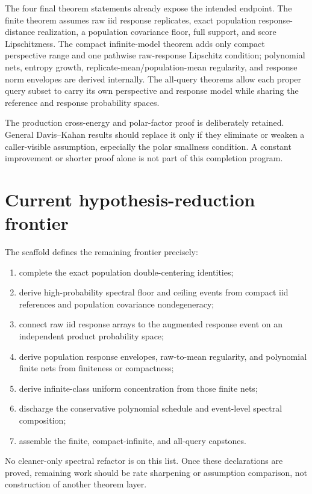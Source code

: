 \documentclass[11pt]{article}
\begin{document}
The four final theorem statements already expose the intended endpoint.  The
finite theorem assumes raw iid response replicates, exact population
response-distance realization, a population covariance floor, full support,
and score Lipschitzness.  The compact infinite-model theorem adds only compact
perspective range and one pathwise raw-response Lipschitz condition; polynomial
nets, entropy growth, replicate-mean/population-mean regularity, and response
norm envelopes are derived internally.  The all-query theorems
allow each proper query subset to carry its own perspective and response model
while sharing the reference and response probability spaces.

The production cross-energy and polar-factor proof is deliberately retained.
General Davis--Kahan results should replace it only if they eliminate or weaken
a caller-visible assumption, especially the polar smallness condition.  A
constant improvement or shorter proof alone is not part of this completion
program.

\section{Current hypothesis-reduction frontier}

The scaffold defines the remaining frontier precisely:
\begin{enumerate}
\item complete the exact population double-centering identities;
\item derive high-probability spectral floor and ceiling events from compact iid
      references and population covariance nondegeneracy;
\item connect raw iid response arrays to the augmented response event on an
      independent product probability space;
\item derive population response envelopes, raw-to-mean regularity, and
      polynomial finite nets from finiteness or compactness;
\item derive infinite-class uniform concentration from those finite nets;
\item discharge the conservative polynomial schedule and event-level spectral
      composition;
\item assemble the finite, compact-infinite, and all-query capstones.
\end{enumerate}

No cleaner-only spectral refactor is on this list.  Once these declarations are
proved, remaining work should be rate sharpening or assumption comparison, not
construction of another theorem layer.
\end{document}

